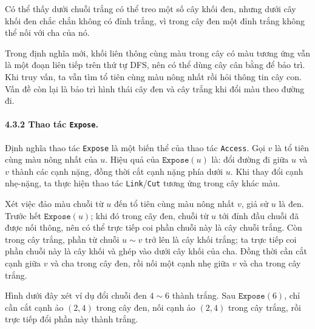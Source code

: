 \documentclass[11pt]{article}
\begin{document}
Có thể thấy dưới chuỗi trắng có thể treo một số cây khối đen, nhưng dưới cây
khối đen chắc chắn không có đỉnh trắng, vì trong cây đen một đỉnh trắng không
thể nối với cha của nó.

Trong định nghĩa mới, khối liên thông cùng màu trong cây có màu tương ứng vẫn là
một đoạn liên tiếp trên thứ tự DFS, nên có thể dùng cây cân bằng để bảo trì. Khi
truy vấn, ta vẫn tìm tổ tiên cùng màu nông nhất rồi hỏi thông tin cây con. Vấn
đề còn lại là bảo trì hình thái cây đen và cây trắng khi đổi màu theo đường đi.

\paragraph{4.3.2 Thao tác \texttt{Expose}.}
Định nghĩa thao tác \texttt{Expose} là một biến thể của thao tác \texttt{Access}.
Gọi \(v\) là tổ tiên cùng màu nông nhất của \(u\). Hiệu quả của
\(\texttt{Expose}(u)\) là: đổi đường đi giữa \(u\) và \(v\) thành các cạnh nặng,
đồng thời cắt cạnh nặng phía dưới \(u\). Khi thay đổi cạnh nhẹ-nặng, ta thực
hiện thao tác \texttt{Link}/\texttt{Cut} tương ứng trong cây khác màu.

Xét việc đảo màu chuỗi từ \(u\) đến tổ tiên cùng màu nông nhất \(v\), giả sử
\(u\) là đen. Trước hết \(\texttt{Expose}(u)\); khi đó trong cây đen, chuỗi từ
\(u\) tới đỉnh đầu chuỗi đã được nối thông, nên có thể trực tiếp coi phần chuỗi
này là cây chuỗi trắng. Còn trong cây trắng, phần từ chuỗi \(u\sim v\) trở lên
là cây khối trắng; ta trực tiếp coi phần chuỗi này là cây khối và ghép vào dưới
cây khối của cha. Đồng thời cần cắt cạnh giữa \(v\) và cha trong cây đen, rồi
nối một cạnh nhẹ giữa \(v\) và cha trong cây trắng.

Hình dưới đây xét ví dụ đổi chuỗi đen \(4\sim 6\) thành trắng. Sau
\(\texttt{Expose}(6)\), chỉ cần cắt cạnh ảo \((2,4)\) trong cây đen, nối cạnh ảo
\((2,4)\) trong cây trắng, rồi trực tiếp đổi phần này thành trắng.
\end{document}
